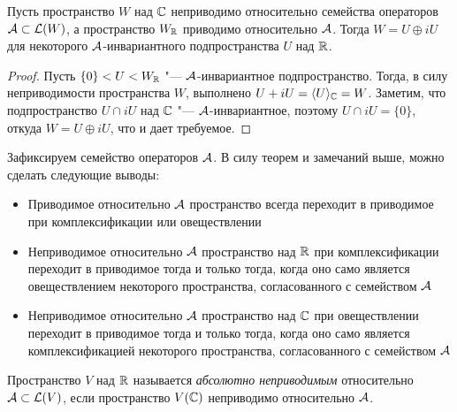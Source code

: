 

\begin{theorem}
	Пусть пространство $W$ над $\mathbb{C}$ неприводимо относительно семейства операторов $\mathcal A \subset \mathcal L(W)$, а пространство $W_{\mathbb{R}}$ приводимо относительно $\mathcal A$. Тогда $W = U \oplus iU$ для некоторого $\mathcal A$-инвариантного подпространства $U$ над $\mathbb{R}$.
\end{theorem}

\begin{proof}
	Пусть $\{0\} < U < W_{\mathbb{R}}$ "--- $\mathcal A$-инвариантное подпространство. Тогда, в силу неприводимости пространства $W$, выполнено $U + iU = \langle U\rangle_{\mathbb{C}} = W$. Заметим, что подпространство $U \cap iU$  над $\mathbb{C}$ "--- $\mathcal A$-инвариантное, поэтому $U \cap iU = \{0\}$, откуда $W = U \oplus iU$, что и дает требуемое.
\end{proof}

\begin{note}
	Зафиксируем семейство операторов $\mathcal A$. В силу теорем и замечаний выше, можно сделать следующие выводы:
	\begin{itemize}
		\item Приводимое относительно $\mathcal A$ пространство всегда переходит в приводимое при комплексификации или овеществлении
		
		\item Неприводимое относительно $\mathcal A$ пространство над $\mathbb{R}$ при комплексификации переходит в приводимое тогда и только тогда, когда оно само является овеществлением некоторого пространства, согласованного с семейством $\mathcal A$
		
		\item Неприводимое относительно $\mathcal A$ пространство над $\mathbb{C}$ при овеществлении переходит в приводимое тогда и только тогда, когда оно само является комплексификацией некоторого пространства, согласованного с семейством $\mathcal A$
	\end{itemize}
\end{note}

\begin{definition}
	Пространство $V$ над $\mathbb{R}$ называется \textit{абсолютно неприводимым} относительно $\mathcal A \subset \mathcal L(V)$, если пространство $V(\mathbb{C})$ неприводимо относительно $\mathcal A$.
\end{definition}